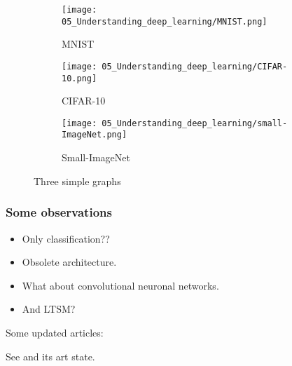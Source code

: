 \begin{frame}
  \begin{figure}
    \centering
    \begin{subfigure}[b]{0.3\textwidth}
        \centering
        \texttt{[image: 05\_Understanding\_deep\_learning/MNIST.png]}
        \caption{MNIST}
        \label{fig:y equals x}
    \end{subfigure}
    \hfill
    \begin{subfigure}[b]{0.3\textwidth}
        \centering
        \texttt{[image: 05\_Understanding\_deep\_learning/CIFAR-10.png]}
        \caption{CIFAR-10}
        \label{fig:three sin x}
    \end{subfigure}
    \hfill
    \begin{subfigure}[b]{0.3\textwidth}
        \centering
        \texttt{[image: 05\_Understanding\_deep\_learning/small-ImageNet.png]}
        \caption{Small-ImageNet}
        \label{fig:five over x}
    \end{subfigure}
       \caption{Three simple graphs}
       \label{fig:three graphs}
\end{figure}
\end{frame}

\begin{frame}
  \frametitle{Some observations}
\begin{itemize}
  \item Only classification??
  \item Obsolete architecture. 
  \item What about convolutional  neuronal networks.
  \item And LTSM?
\end{itemize}

Some updated articles: 

See \cite{StudyingTheEvolutionofNeuralActivationPatternsDuringTrainingofFeed-ForwardReLUNetworks}
and its art state. 


\end{frame}

